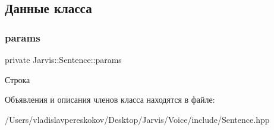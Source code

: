 \subsection{Данные класса}
\mbox{\label{classJarvis_1_1Sentence_a9a5cdde8bf7dc872ec20ff6afac01a0a}} 
\subsubsection{\texorpdfstring{params}{params}}
{\footnotesize\ttfamily private Jarvis\+::\+Sentence\+::params}

Строка 

Объявления и описания членов класса находятся в файле\+:\begin{DoxyCompactItemize}
\item 
/\+Users/vladislavpereskokov/\+Desktop/\+Jarvis/\+Voice/include/Sentence.\+hpp\end{DoxyCompactItemize}
